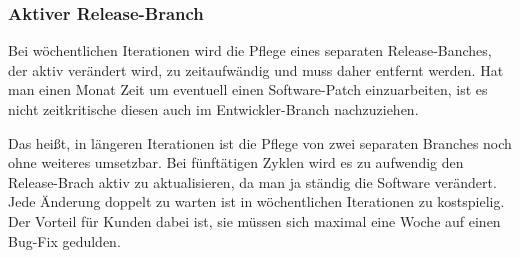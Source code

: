 \subsubsection{Aktiver Release-Branch}
Bei wöchentlichen Iterationen wird die Pflege eines separaten Release-Banches, der aktiv verändert wird, zu zeitaufwändig und muss daher entfernt werden. Hat man einen Monat Zeit um eventuell einen Software-Patch einzuarbeiten, ist es nicht zeitkritische diesen auch im Entwickler-Branch nachzuziehen. 

Das heißt, in längeren Iterationen ist die Pflege von zwei separaten Branches noch ohne weiteres umsetzbar. Bei fünftätigen Zyklen wird es zu aufwendig den Release-Brach aktiv zu aktualisieren, da man ja ständig die Software verändert. Jede Änderung doppelt zu warten ist in wöchentlichen Iterationen zu kostspielig. Der Vorteil für Kunden dabei ist, sie müssen sich maximal eine Woche auf einen Bug-Fix gedulden.

